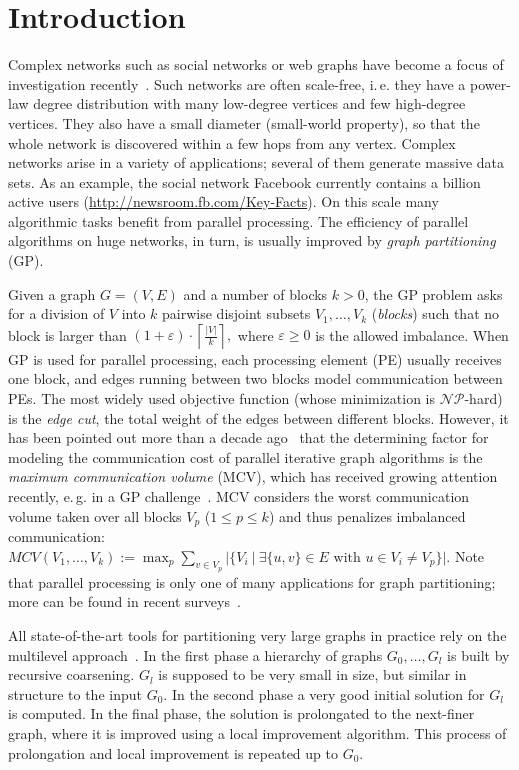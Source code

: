 \documentclass[pdftex]{llncs}
\newcommand{\eg}{e.\,g.\xspace}
\newcommand{\ie}{i.\,e.\xspace}
\numberwithin{equation}{section}
\numberwithin{example}{section}
\numberwithin{table}{section}
\begin{document}
\section{Introduction}
\label{sec:intro}
Complex networks such as social networks or web graphs have
become a focus of investigation recently~\cite{costa2011analyzing}.
Such networks are often scale-free, \ie they have a power-law
degree distribution with many low-degree vertices and few high-degree vertices.
They also have a small diameter (small-world property), 
so that the whole network is discovered within a few hops from any vertex.
Complex networks arise in a variety of applications; several of them generate massive data sets.
As an example, the social network Facebook currently contains a billion active 
users (\url{http://newsroom.fb.com/Key-Facts}).
On this scale many algorithmic tasks benefit from parallel processing.
The efficiency of parallel algorithms on huge networks, in turn,
is usually improved by \emph{graph partitioning} (GP).


Given a graph $G=(V,E)$ and a number of blocks $k>0$, the GP problem asks for a
division of $V$ into $k$ pairwise disjoint subsets $V_1, \dots, V_k$
(\emph{blocks}) such that no block is larger than
$(1+\varepsilon)\cdot \left\lceil\frac{|V|}{k}\right\rceil,$
where $\varepsilon \geq 0$ is the allowed imbalance. When GP is used for parallel processing, each 
processing element (PE) usually receives one block, and edges running between two blocks model communication
between PEs. The most widely used objective function (whose minimization is $\mathcal{NP}$-hard) is the \emph{edge cut}, the total weight of the edges between different blocks.
However, it has been pointed out more than a decade ago~\cite{Hendrickson_graphpartitioning} that 
the determining factor for modeling the communication cost of parallel iterative graph algorithms is the
\emph{maximum communication volume} (MCV), which has received growing attention 
recently, \eg in a GP challenge~\cite{BaderMSW12dimacs}. 
MCV considers the worst communication volume taken over all blocks $V_p$
($1 \leq p \leq k$) and thus penalizes imbalanced communication:
$MCV(V_1, \dots, V_k) := \max_p \sum_{v \in V_p} |\{ V_i ~|~ \exists \{u, v\} \in E \mbox{ with } u \in V_i  \neq V_p\}|.$
Note that parallel processing is only one of many applications for graph partitioning; more can
be found in recent surveys~\cite{GPOverviewBook,SPPGPOverviewPaper}.

All state-of-the-art tools for partitioning very large graphs in
practice rely on the multilevel approach~\cite{SPPGPOverviewPaper}.
In the first phase a hierarchy of graphs $G_{0},\dots,G_{l}$ is built
by recursive coarsening. $G_{l}$ is supposed to
 be very small in
size, but similar in structure to the input 
 $G_{0}$. In the second
phase a very good initial solution for $G_{l}$
 is computed. In the
final phase, the solution is prolongated to the next-finer
 graph,
where it is improved using a local improvement algorithm. This
process of prolongation and local improvement is repeated up to
$G_{0}$.
\end{document}

